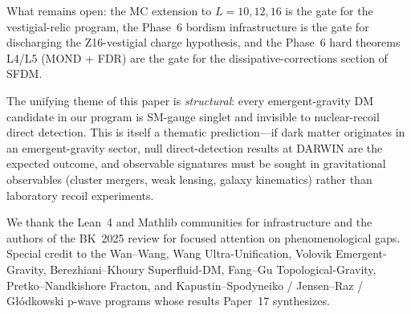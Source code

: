 \documentclass[aps,prd,twocolumn,showpacs,superscriptaddress,nofootinbib]{revtex4-2}
\begin{document}
What remains open: the MC extension to $L = 10, 12, 16$ is the gate
for the vestigial-relic program, the Phase~6 bordism infrastructure
is the gate for discharging the Z16-vestigial charge hypothesis,
and the Phase~6 hard theorems L4/L5 (MOND + FDR) are the
gate for the dissipative-corrections section of SFDM.

The unifying theme of this paper is \emph{structural}: every
emergent-gravity DM candidate in our program is SM-gauge singlet and
invisible to nuclear-recoil direct detection. This is itself a
thematic prediction---if dark matter originates in an emergent-gravity
sector, null direct-detection results at DARWIN are the expected
outcome, and observable signatures must be sought in gravitational
observables (cluster mergers, weak lensing, galaxy kinematics) rather
than laboratory recoil experiments.

\begin{acknowledgments}
We thank the Lean~4 and Mathlib communities for infrastructure and
the authors of the BK~2025 review for focused attention on
phenomenological gaps. Special credit to the Wan--Wang, Wang
Ultra-Unification, Volovik Emergent-Gravity, Berezhiani--Khoury
Superfluid-DM, Fang--Gu Topological-Gravity, Pretko--Nandkishore
Fracton, and Kapustin--Spodyneiko / Jensen--Raz / G{\l}{\'o}dkowski
p-wave programs whose results Paper~17 synthesizes.
\end{acknowledgments}
\end{document}

